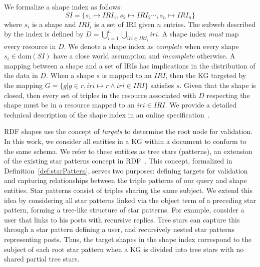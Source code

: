 We formalize a shape index as follows:
\begin{equation}\label{eq:shapeIndex}
   SI = \{s_1 \mapsto IRI_1, s_2 \mapsto IRI_2 \cdots, s_n \mapsto IRI_n\}
\end{equation}
where $s_i$ is a shape and $IRI_i$ is a set of IRI given $n$ entries.
The subweb described by the index is defined by $D = \bigcup_{i=1}^{n} \bigcup_{iri \in IRI_i} iri$.
A shape index \emph{must} map every resource in $D$.
We denote a shape index as \emph{complete} when every shape $s_i \in \text{dom}(SI)$ have a close world assumption and \emph{incomplete} otherwise.
A mapping between a shape and a set of IRIs has implications in the distribution of the data in $D$.
When a shape $s$ is mapped to an $IRI$, then the KG targeted by the mapping $G = \{g | g \in r, iri \mapsto r \land iri \in IRI\}$ satisfies $s$.
Given that the shape is closed, then every set of triples in the resource associated with $D$ respecting the shape must be in a resource mapped to an $iri \in IRI$.
We provide a detailed technical description of the shape index in an online specification~.


RDF shapes use the concept of \emph{targets} to determine the root node for validation.
In this work, we consider all entities in a KG within a document to conform to the same schema.
We refer to these entities as tree stars (patterns), an extension of the existing star patterns concept in RDF~\cite{Karim2020}.
This concept, formalized in Definition~\ref{def:starPattern}, serves two purposes: defining targets for validation and capturing relationships between the triple patterns of our query and shape entities.
Star patterns consist of triples sharing the same subject.
We extend this idea by considering all star patterns linked via the object term of a preceding star pattern, forming a tree-like structure of star patterns.
For example, consider a user that links to his posts with recursive replies.
Tree stars can capture this through a star pattern defining a user, and recursively nested star patterns representing posts.
Thus, the target shapes in the shape index correspond to the subject of each root star pattern when a KG is divided into tree stars with no shared partial tree stars.

